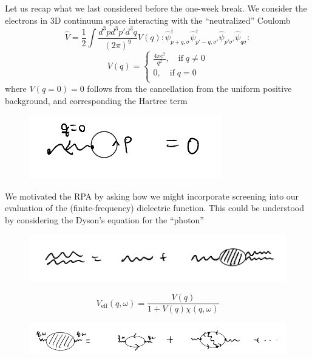 Let us recap what we last considered before the one-week break. We consider the electrons in 3D continuum space interacting with the ``neutralized'' Coulomb
\[ \hat{V}=\frac{1}{2}\int{\frac{d^3pd^3p'd^3q}{\left( 2\pi \right) ^9}V\left( q \right) :\hat{\psi}_{p+q,\sigma}^{\dagger}\hat{\psi}_{p'-q,\sigma '}^{\dagger}\hat{\psi}_{p'\sigma '}\hat{\psi}_{q\sigma}:}\]
\[ V\left( q \right) =\begin{cases}
	\frac{4\pi e^2}{q^2},\quad \mathrm{if}\; q\ne 0\\
	0,\quad \mathrm{if}\; q=0\\
\end{cases}\]
where $V(q=0)=0$ follows from the cancellation from the uniform positive background, and corresponding the Hartree term
\begin{figure}[H]
    \centering
    \includegraphics[width=\textwidth]{jupyterbook/data/fig/lec20-fig00.png}
\end{figure}
We motivated the RPA by asking how we might incorporate screening into our evaluation of the (finite-frequency) dielectric function. This could be understood by considering the Dyson's equation for the ``photon''
\begin{figure}[H]
    \centering
    \includegraphics[width=\textwidth]{jupyterbook/data/fig/lec20-fig01.png}
\end{figure}
\[ V_{\mathrm{eff}}\left( q,\omega \right) =\frac{V\left( q \right)}{1+V\left( q \right) \chi \left( q,\omega \right)}\]
\begin{figure}[H]
    \centering
    \includegraphics[width=\textwidth]{jupyterbook/data/fig/lec20-fig02.png}
\end{figure}
